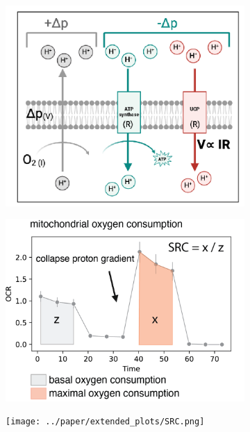 \begin{figure}[H]
\begin{subfigure}[t]{0.33\textwidth}
        \caption{}
        \includegraphics[width=\textwidth]{../paper/main_plots/uncoupling_cartoon.png}        
    \end{subfigure}  
    \begin{subfigure}[t]{0.33\textwidth}
        \caption{}
        \includegraphics[width=\textwidth]{../paper/extended_plots/src_cartoon.png}        
    \end{subfigure} 
    \begin{subfigure}[t]{0.25\textwidth}
        \caption{}
        \texttt{[image: ../paper/extended\_plots/SRC.png]}        
    \end{subfigure} 

\end{figure}
